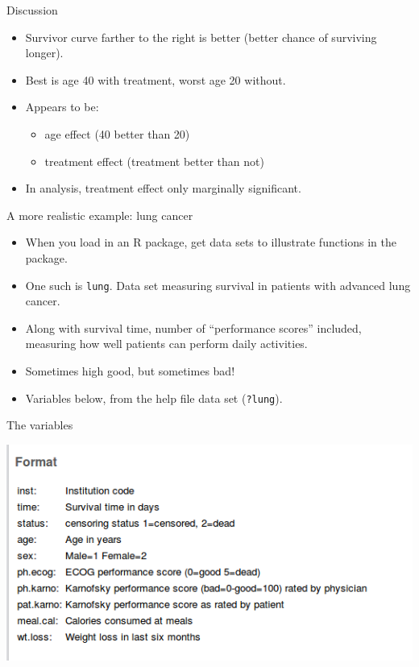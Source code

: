 \begin{frame}[fragile]{Discussion}

  
  \begin{itemize}
  \item Survivor curve farther to the right is better (better chance
    of surviving longer).
  \item Best is age 40 with treatment, worst age 20 without.
  \item Appears to be:
    \begin{itemize}
    \item age effect (40 better than 20)
    \item treatment effect (treatment better than not)
    \end{itemize}
  \item In analysis, treatment effect only marginally significant.
  \end{itemize}

\end{frame}



\begin{frame}[fragile]{A more realistic example: lung cancer}


\begin{itemize}
\item When you
load in an R package, get data sets to illustrate 
functions in the package. 
\item One such is \texttt{lung}. Data
set measuring survival in patients with advanced lung cancer. 
\item Along with survival time, number of ``performance scores''
  included, measuring how well patients can perform daily
  activities.
\item Sometimes high good, but sometimes bad!
\item Variables below,
  from the help file data set (\texttt{?lung}).
\end{itemize}
\end{frame}

\begin{frame}[fragile]{The variables}

\includegraphics[width=\textwidth]{lung-cancer-data}  

  
\end{frame}

